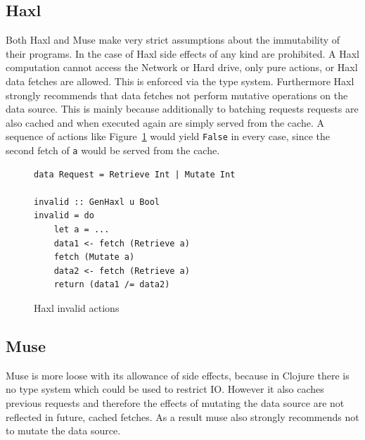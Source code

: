 \subsection{Haxl}

Both Haxl and Muse make very strict assumptions about the immutability of their programs.
In the case of Haxl side effects of any kind are prohibited.
A Haxl computation cannot access the Network or Hard drive, only pure actions, or Haxl data fetches are allowed.
This is enforced via the type system.
Furthermore Haxl strongly recommends that data fetches not perform mutative operations on the data source.
This is mainly because additionally to batching requests requests are also cached and when executed again are simply served from the cache.
A sequence of actions like Figure~\ref{fig:haxl-invalid-actions} would yield \texttt{False} in every case, since the second fetch of \texttt{a} would be served from the cache.

\begin{figure}
\begin{verbatim}
data Request = Retrieve Int | Mutate Int

invalid :: GenHaxl u Bool
invalid = do
    let a = ...
    data1 <- fetch (Retrieve a)
    fetch (Mutate a)
    data2 <- fetch (Retrieve a)
    return (data1 /= data2)
\end{verbatim}
\caption{Haxl invalid actions}
\label{fig:haxl-invalid-actions}
\end{figure}

\subsection{Muse}

Muse is more loose with its allowance of side effects, because in Clojure there is no type system which could be used to restrict IO.
However it also caches previous requests and therefore the effects of mutating the data source are not reflected in future, cached fetches.
As a result muse also strongly recommends not to mutate the data source.

